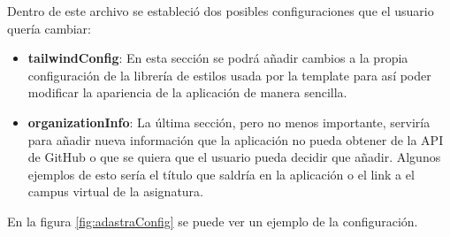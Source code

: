 Dentro de este archivo se estableció dos posibles configuraciones que el usuario quería cambiar:
\begin{itemize}
    \item \textbf{tailwindConfig}: En esta sección se podrá añadir cambios a la propia configuración de la librería de estilos usada por la template para así poder modificar la apariencia de la aplicación de manera sencilla.
    \item \textbf{organizationInfo}: La última sección, pero no menos importante, serviría para añadir nueva información que la aplicación no pueda obtener de la API de GitHub o que se quiera que el usuario pueda decidir que añadir. Algunos ejemplos de esto sería el título que saldría en la aplicación o el link a el campus virtual de la asignatura.
\end{itemize}

En la figura \ref{fig:adastraConfig} se puede ver un ejemplo de la configuración.